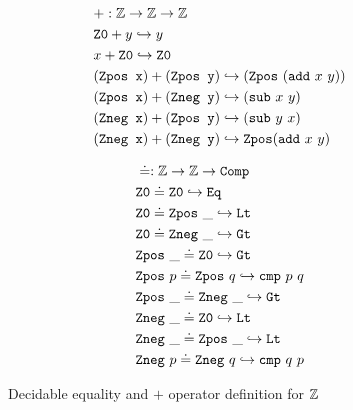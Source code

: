 \begin{figure}
\centering
\begin{minipage}[t]{0.48\textwidth}
\begin{align*}
&+: \mathbb{Z} \rightarrow \mathbb{Z} \rightarrow \mathbb{Z} \\
& \texttt{Z0} + y \hookrightarrow y \\
& x + \texttt{Z0} \hookrightarrow \texttt{Z0} \\
& (\texttt{Zpos x}) + (\texttt{Zpos y}) \hookrightarrow (\texttt{Zpos}~(\texttt{add}~x~y))  \\
& (\texttt{Zpos x}) + (\texttt{Zneg y}) \hookrightarrow (\texttt{sub}~x~y)  \\
& (\texttt{Zneg x}) + (\texttt{Zpos y}) \hookrightarrow (\texttt{sub}~y~x)  \\
& (\texttt{Zneg x}) + (\texttt{Zneg y}) \hookrightarrow \texttt{Zpos}(\texttt{add}~x~y)  \\
\end{align*}
\hfill
\end{minipage}
\begin{minipage}[t]{0.48\textwidth}
\begin{align*}
&\doteq : \mathbb{Z} \rightarrow \mathbb{Z} \rightarrow \texttt{Comp} \\
& \texttt{Z0} \doteq \texttt{Z0} \hookrightarrow \texttt{Eq} \\
& \texttt{Z0} \doteq \texttt{Zpos}~\_ \hookrightarrow \texttt{Lt} \\
& \texttt{Z0} \doteq \texttt{Zneg}~\_ \hookrightarrow \texttt{Gt} \\
& \texttt{Zpos}~\_ \doteq \texttt{Z0} \hookrightarrow \texttt{Gt} \\
& \texttt{Zpos}~p \doteq \texttt{Zpos}~q \hookrightarrow \texttt{cmp}~p~q \\
& \texttt{Zpos}~\_ \doteq \texttt{Zneg}~\_ \hookrightarrow \texttt{Gt} \\
& \texttt{Zneg}~\_ \doteq \texttt{Z0} \hookrightarrow \texttt{Lt} \\
& \texttt{Zneg}~\_ \doteq \texttt{Zpos}~\_ \hookrightarrow \texttt{Lt} \\
& \texttt{Zneg}~p \doteq \texttt{Zneg}~q \hookrightarrow \texttt{cmp}~q~p \\
\end{align*}
\end{minipage}
\caption{Decidable equality and $+$ operator definition for $\mathbb{Z}$}
\label{fig:arith-ops}
\end{figure}

